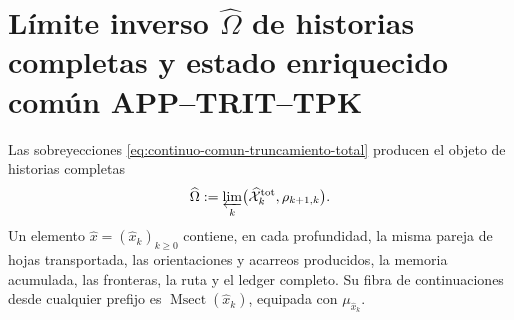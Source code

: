 \section{Límite inverso \(\widehat\Omega\) de historias completas y estado enriquecido común APP–TRIT–TPK}
\label{sec:continuo-comun-limite}

Las sobreyecciones \eqref{eq:continuo-comun-truncamiento-total} producen el
objeto de historias completas
\begin{equation}
\label{eq:continuo-comun-omega}
 \widehat\Omega
 :=\varprojlim_k
 \bigl(\widehat{\mathcal X}^{\rm tot}_k,\rho_{k+1,k}\bigr).
\end{equation}
Un elemento \(\widehat x=(\widehat x_k)_{k\geq0}\) contiene, en cada
profundidad, la misma pareja de hojas transportada, las orientaciones y
acarreos producidos, la memoria acumulada, las fronteras, la ruta y el ledger
completo.  Su fibra de continuaciones desde cualquier prefijo es
\(\operatorname{Msect}(\widehat x_k)\), equipada con
\(\mu_{\widehat x_k}\).

